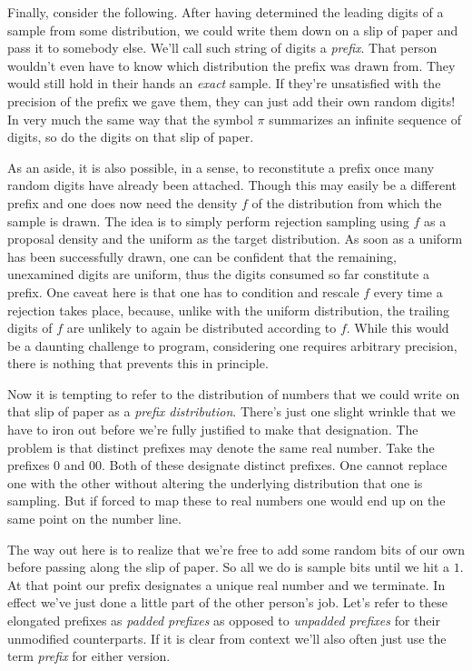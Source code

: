 \documentclass{article}
\begin{document}
Finally, consider the following. After having determined the leading digits of a sample from some distribution, we could write them down on a slip of paper and pass it to somebody else. We'll call such string of digits a \textit{prefix}. That person wouldn't even have to know which distribution the prefix was drawn from. They would still hold in their hands an \textit{exact} sample. If they're unsatisfied with the precision of the prefix we gave them, they can just add their own random digits! In very much the same way that the symbol $\pi$ summarizes an infinite sequence of digits, so do the digits on that slip of paper.

As an aside, it is also possible, in a sense, to reconstitute a prefix once many random digits have already been attached. Though this may easily be a different prefix and one does now need the density $f$ of the distribution from which the sample is drawn. The idea is to simply perform rejection sampling using $f$ as a proposal density and the uniform as the target distribution. As soon as a uniform has been successfully drawn, one can be confident that the remaining, unexamined digits are uniform, thus the digits consumed so far constitute a prefix. One caveat here is that one has to condition and rescale $f$ every time a rejection takes place, because, unlike with the uniform distribution, the trailing digits of $f$ are unlikely to again be distributed according to $f$. While this would be a daunting challenge to program, considering one requires arbitrary precision, there is nothing that prevents this in principle.

Now it is tempting to refer to the distribution of numbers that we could write on that slip of paper as a \textit{prefix distribution}. There's just one slight wrinkle that we have to iron out before we're fully justified to make that designation. The problem is that distinct prefixes may denote the same real number. Take the prefixes $0$ and $00$. Both of these designate distinct prefixes. One cannot replace one with the other without altering the underlying distribution that one is sampling. But if forced to map these to real numbers one would end up on the same point on the number line.

The way out here is to realize that we're free to add some random bits of our own before passing along the slip of paper. So all we do is sample bits until we hit a $1$. At that point our prefix designates a unique real number and we terminate. In effect we've just done a little part of the other person's job. Let's refer to these elongated prefixes as \textit{padded prefixes} as opposed to \textit{unpadded prefixes} for their unmodified counterparts. If it is clear from context we'll also often just use the term \textit{prefix} for either version.

\begin{thebibliography}{1}

\end{thebibliography}

\vfill\eject
\end{document}
